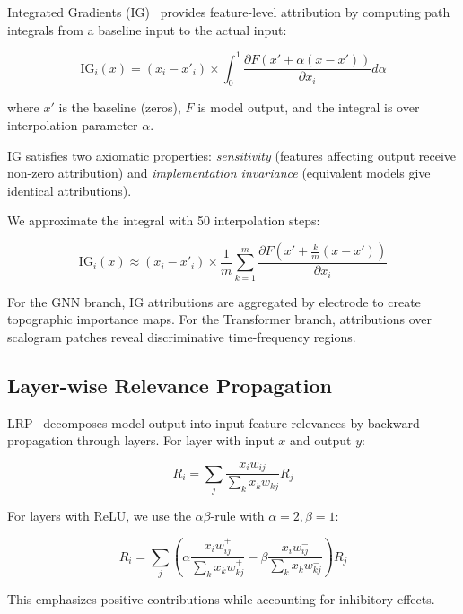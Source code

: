 \documentclass[blue,fullpaper]{ludusofficial}  %
\begin{document}
Integrated Gradients (IG)~\cite{sundararajan2017axiomatic} provides feature-level attribution by computing path integrals from a baseline input to the actual input:

\begin{equation}
\text{IG}_i(x) = (x_i - x'_i) \times \int_0^1 \frac{\partial F(x' + \alpha(x-x'))}{\partial x_i} d\alpha
\end{equation}

where $x'$ is the baseline (zeros), $F$ is model output, and the integral is over interpolation parameter $\alpha$.

IG satisfies two axiomatic properties: \textit{sensitivity} (features affecting output receive non-zero attribution) and \textit{implementation invariance} (equivalent models give identical attributions).

We approximate the integral with 50 interpolation steps:

\begin{equation}
\text{IG}_i(x) \approx (x_i - x'_i) \times \frac{1}{m}\sum_{k=1}^{m} \frac{\partial F(x' + \frac{k}{m}(x-x'))}{\partial x_i}
\end{equation}

For the GNN branch, IG attributions are aggregated by electrode to create topographic importance maps. For the Transformer branch, attributions over scalogram patches reveal discriminative time-frequency regions.

\subsection{Layer-wise Relevance Propagation}

LRP~\cite{bach2015pixel} decomposes model output into input feature relevances by backward propagation through layers. For layer with input $x$ and output $y$:

\begin{equation}
R_i = \sum_j \frac{x_i w_{ij}}{\sum_k x_k w_{kj}} R_j
\end{equation}

For layers with ReLU, we use the $\alpha\beta$-rule with $\alpha=2, \beta=1$:

\begin{equation}
R_i = \sum_j \left(\alpha \frac{x_i w_{ij}^+}{\sum_k x_k w_{kj}^+} - \beta \frac{x_i w_{ij}^-}{\sum_k x_k w_{kj}^-}\right) R_j
\end{equation}

This emphasizes positive contributions while accounting for inhibitory effects.
\end{document}
